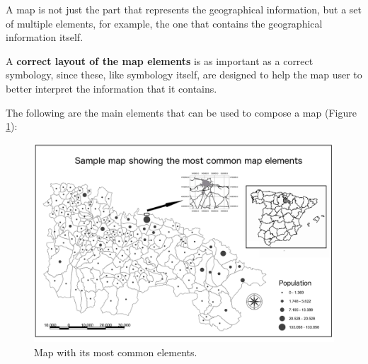 A map is not just the part that represents the geographical information, but a set of multiple elements, for example, the one that contains the geographical information itself.

A \textbf{correct layout of the map elements} is as important as a correct symbology, since these, like symbology itself, are designed to help the map user to better interpret the information that it contains.

The following are the main elements that can be used to compose a map (Figure \ref{Fig:MapElements}):

\begin{figure}[!hbt]
\centering
\includegraphics[width=\columnwidth]{Visualization/MapElements.png}
\caption{\small Map with its most common elements.}
\label{Fig:MapElements} 
\end{figure}

